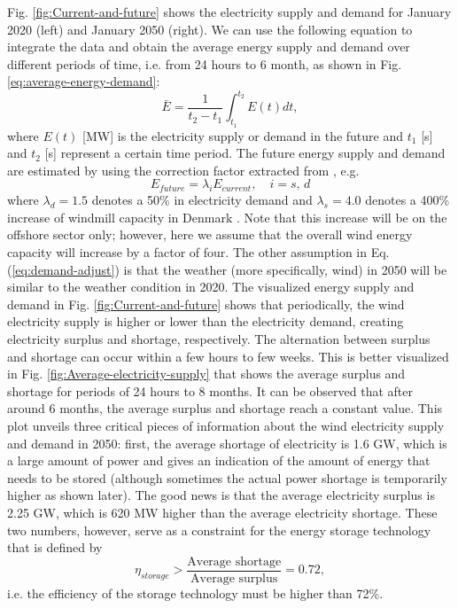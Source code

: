 \documentclass{ECOS_2021}
\begin{document}
Fig. \ref{fig:Current-and-future} shows the electricity supply and
demand for January 2020 (left) and January 2050 (right). We can use
the following equation to integrate the data and obtain the average
energy supply and demand over different periods of time, i.e. from
24 hours to 6 month, as shown in Fig. \ref{eq:average-energy-demand}:
\begin{equation}
\bar{E}=\frac{1}{t_{2}-t_{1}}\int_{t_{1}}^{t_{2}}E\left(t\right)dt,\label{eq:average-energy-demand}
\end{equation}
where $E(t)$ {[}MW{]} is the electricity supply or demand in the
future and $t_{1}$ {[}s{]} and $t_{2}$ {[}s{]} represent a certain
time period. The future energy supply and demand are estimated by
using the correction factor extracted from \cite{eftekhari_quantifying_2020},
e.g.
\begin{equation}
E_{future}=\lambda_{i}E_{current},\quad i=s,\,d\label{eq:demand-adjust}
\end{equation}
where $\lambda_{d}=1.5$ denotes a 50\% in electricity demand and
$\lambda_{s}=4.0$ denotes a 400\% increase of windmill capacity in
Denmark \cite{noauthor_denmark_2020,noauthor_energy_2021}. Note that
this increase will be on the offshore sector only; however, here we
assume that the overall wind energy capacity will increase by a factor
of four. The other assumption in Eq. (\ref{eq:demand-adjust}) is
that the weather (more specifically, wind) in 2050 will be similar
to the weather condition in 2020. The visualized energy supply and
demand in Fig. \ref{fig:Current-and-future} shows that periodically,
the wind electricity supply is higher or lower than the electricity
demand, creating electricity surplus and shortage, respectively. The
alternation between surplus and shortage can occur within a few hours
to few weeks. This is better visualized in Fig. \ref{fig:Average-electricity-supply}
that shows the average surplus and shortage for periods of 24 hours
to 8 months. It can be observed that after around 6 months, the average
surplus and shortage reach a constant value. This plot unveils three
critical pieces of information about the wind electricity supply and
demand in 2050: first, the average shortage of electricity is 1.6
GW, which is a large amount of power and gives an indication of the
amount of energy that needs to be stored (although sometimes the actual
power shortage is temporarily higher as shown later). The good news
is that the average electricity surplus is 2.25 GW, which is 620 MW
higher than the average electricity shortage. These two numbers, however,
serve as a constraint for the energy storage technology that is defined
by
\[
\eta_{storage}>\frac{\text{Average shortage}}{\text{Average surplus}}=0.72,
\]
i.e. the efficiency of the storage technology must be higher than
72\%.
\end{document}
